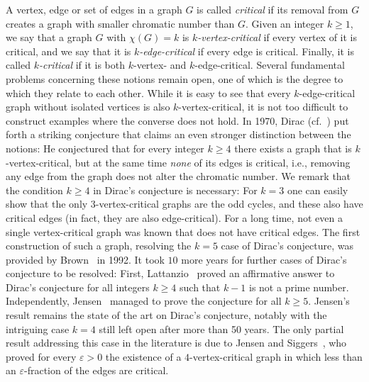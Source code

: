\documentclass[a4paper,10pt,hidelinks]{amsart}
\theoremstyle{definition}
\begin{document}
A vertex, edge or set of edges in a graph $G$ is called \emph{critical} if its removal from $G$ creates a graph with smaller chromatic number than $G$. Given an integer $k\ge 1$, we say that a graph $G$ with $\chi(G)=k$ is \emph{$k$-vertex-critical} if every vertex of it is critical, and we say that it is \emph{$k$-edge-critical} if every edge is critical. Finally, it is called \emph{$k$-critical} if it is both $k$-vertex- and $k$-edge-critical. Several fundamental problems concerning these notions remain open, one of which is the degree to which they relate to each other. While it is easy to see that every $k$-edge-critical graph without isolated vertices is also $k$-vertex-critical, it is not too difficult to construct examples where the converse does not hold. In 1970, Dirac (cf.~\cite{lattanzio,erdos}) put forth a striking conjecture that claims an even stronger distinction between the notions: He conjectured that for every integer $k\ge 4$ there exists a graph that is $k$-vertex-critical, but at the same time \emph{none} of its edges is critical, i.e., removing any edge from the graph does not alter the chromatic number. We remark that the condition $k\ge 4$ in Dirac's conjecture is necessary: For $k=3$ one can easily show that the only $3$-vertex-critical graphs are the odd cycles, and these also have critical edges (in fact, they are also edge-critical). For a long time, not even a single vertex-critical graph was known that does not have critical edges. The first construction of such a graph, resolving the $k=5$ case of Dirac's conjecture, was provided by Brown~\cite{brown} in 1992. It took $10$ more years for further cases of Dirac's conjecture to be resolved: First, Lattanzio~\cite{lattanzio} proved an affirmative answer to Dirac's conjecture for all integers $k\ge 4$ such that $k-1$ is not a prime number. Independently, Jensen~\cite{jensen} managed to prove the conjecture for all $k\ge 5$. Jensen's result remains the state of the art on Dirac's conjecture, notably with the intriguing case $k=4$ still left open after more than 50 years. The only partial result addressing this case in the literature is due to Jensen and Siggers~\cite{jensensiggers}, who proved for every $\varepsilon>0$ the existence of a $4$-vertex-critical graph in which less than an $\varepsilon$-fraction of the edges are critical.
\end{document}
